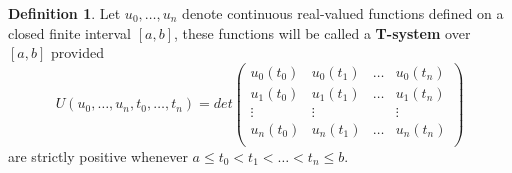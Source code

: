 \documentclass[12pt]{amsart}
\theoremstyle{definition}
\newtheorem{definition}{Definition}[section]
\theoremstyle{remark}
\numberwithin{equation}{section}
\begin{document}
\begin{definition}\label{deft}
    Let $u_0, \ldots, u_n$ denote continuous real-valued functions defined on a closed finite interval $[a,b]$, these functions will be called a \textbf{T-system} over $[a,b]$ provided  
\[U(u_0,\ldots,u_n, t_0,\ldots,t_n) = det\left ( \begin{array}{cccc}\label{eq: tdef2}
u_0(t_0) &u_0(t_1) &\ldots &u_0(t_n) \\
u_1(t_0) &u_1(t_1) &\ldots &u_1(t_n) \\
\vdots & \vdots &&\vdots\\
u_n(t_0) &u_n(t_1) &\ldots &u_n(t_n) \\
\end{array}\right)
    \] are strictly positive whenever $a\le t_0 <t_1< \ldots< t_n\le b$.
\end{definition}




      
\end{document}
